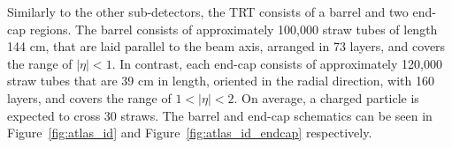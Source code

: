 Similarly to the other sub-detectors, the TRT consists of a barrel and two end-cap regions. The barrel consists of approximately 100,000 straw tubes of length 144 cm, that are laid parallel to the beam axis, arranged in 73 layers, and covers the range of $|\eta| < 1$. In contrast, each end-cap consists of approximately 120,000 straw tubes that are 39 cm in length, oriented in the radial direction, with 160 layers, and covers the range of $1 < |\eta| < 2$. On average, a charged particle is expected to cross 30 straws. The barrel and end-cap schematics can be seen in Figure~\ref{fig:atlas_id} and Figure~\ref{fig:atlas_id_endcap} respectively.